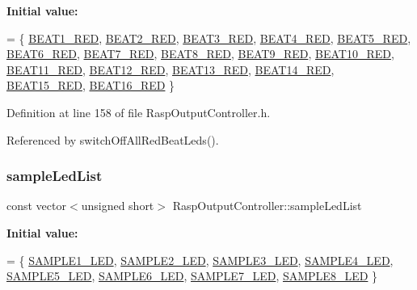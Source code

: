 {\bfseries Initial value\+:}
\begin{DoxyCode}
= \{
            \hyperlink{namespaceoutputs_ae1c055268c6bbfadcc272bc6028b1a59}{BEAT1\_RED}, \hyperlink{namespaceoutputs_a7b5646e7b81bc49443f10f2b852384bb}{BEAT2\_RED}, \hyperlink{namespaceoutputs_a0c48c063f394a0735f24036e932bff2b}{BEAT3\_RED}, 
      \hyperlink{namespaceoutputs_a73a38f1135a723ebb294500daa641aec}{BEAT4\_RED}, \hyperlink{namespaceoutputs_a992a202d7fce79a524fe71498efb3709}{BEAT5\_RED}, \hyperlink{namespaceoutputs_a44e21deb20acdd11aa47bd5c2358dd6c}{BEAT6\_RED}, \hyperlink{namespaceoutputs_a88730a5804ff8785e2fb07a1957a243c}{BEAT7\_RED}, 
      \hyperlink{namespaceoutputs_aeb7e7b9874ac290d2ff579a8b144fe13}{BEAT8\_RED}, \hyperlink{namespaceoutputs_a57a4d2c831b8b263bc763032afddaa03}{BEAT9\_RED},
            \hyperlink{namespaceoutputs_a3108e2ed7adaa0c15822673c1cf5341d}{BEAT10\_RED}, \hyperlink{namespaceoutputs_a3b55bd1a681764d7655dfee327930872}{BEAT11\_RED}, \hyperlink{namespaceoutputs_a3138968cd14e309f1e88228bd1259f3f}{BEAT12\_RED}, 
      \hyperlink{namespaceoutputs_a34ead0f387c2557f9d74d57186f1578f}{BEAT13\_RED}, \hyperlink{namespaceoutputs_ae72dd425b992846bc954f41227bdda1a}{BEAT14\_RED}, \hyperlink{namespaceoutputs_a6cdbcf8d70f85316af1ea2b96d9b72bd}{BEAT15\_RED}, \hyperlink{namespaceoutputs_a3dbc6b2fd920d581b752b72f86be3733}{BEAT16\_RED}
    \}
\end{DoxyCode}


Definition at line 158 of file Rasp\+Output\+Controller.\+h.



Referenced by switch\+Off\+All\+Red\+Beat\+Leds().

\mbox{\label{class_rasp_output_controller_ad0ad19b081450eb1d9cd6548c14a23ea}} 
\subsubsection{\texorpdfstring{sample\+Led\+List}{sampleLedList}}
{\footnotesize\ttfamily const vector$<$unsigned short$>$ Rasp\+Output\+Controller\+::sample\+Led\+List\hspace{0.3cm}{\ttfamily [private]}}

{\bfseries Initial value\+:}
\begin{DoxyCode}
= \{
            \hyperlink{namespaceoutputs_a151156390f60151968f4092740d9d6b8}{SAMPLE1\_LED}, \hyperlink{namespaceoutputs_ae0776935fda36be3a645994d16591980}{SAMPLE2\_LED}, \hyperlink{namespaceoutputs_a8a0be2be0ae271cb8b57234a189b6689}{SAMPLE3\_LED}, 
      \hyperlink{namespaceoutputs_a6fbee7a72f91577a7e1f072d00ad8d9f}{SAMPLE4\_LED}, \hyperlink{namespaceoutputs_a87e2d51fbeb2ac9fd23fc5d937b1c7c2}{SAMPLE5\_LED}, \hyperlink{namespaceoutputs_a7bdee2eb9fc676ac7edb9582334be15a}{SAMPLE6\_LED}, 
      \hyperlink{namespaceoutputs_a3d438bc8ce91fb825bf2da7834ac639e}{SAMPLE7\_LED}, \hyperlink{namespaceoutputs_ac6e07c06d1d512716e6309db54648440}{SAMPLE8\_LED}
    \}
\end{DoxyCode}


